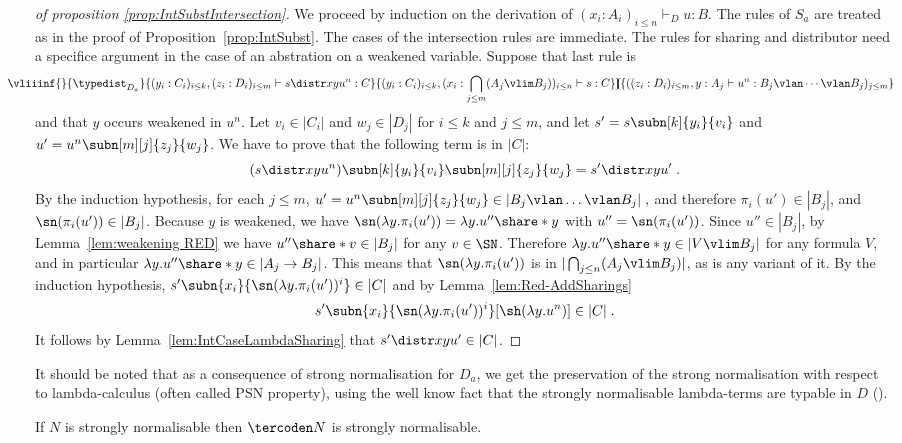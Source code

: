 \begin{proof}[of proposition \ref{prop:IntSubstIntersection}]
%
We proceed by induction on the derivation of $(x_i:A_i)_{i\leq n}\vdash_D u:B$. The rules of $S_a$ are treated as in the proof of Proposition~\ref{prop:IntSubst}. The cases of the 
intersection rules are immediate. The rules for sharing and distributor need a specifice argument in the case of an abstration on a weakened variable. Suppose that last rule is
\[
\hspace{-\leftmargin}
  \vliiinf{}{\typedist_{D_a}}
	{(y_i:C_i)_{i\leq k}, (z_i:D_i)_{i\leq m} \vdash s\distr xy{u^n} : C}
	{(y_i:C_i)_{i\leq k}, (x_i:\bigcap_{j\leq m}(A_j \vlim B_j))_{i\leq n} \vdash s : C}
	{\hspace{-6pt}}
	{((z_i:D_i)_{i\leq m}, y : A_j \vdash u^n : B_j\vlan\cdots\vlan B_j)_{j\leq m}}
\]
and that $y$ occurs weakened in $u^n$. Let $v_i\in|C_i|$ and $w_j\in|D_j|$ for $i\leq k$ and $j\leq m$, and let $s'=s\subn[k]{y_i}{v_i}$ and $u'=u^n\subn[m][j]{z_j}{w_j}$.
%
We have to prove that the following term is in $|C|$:
\[
	(s\distr xy{u^n})\subn[k]{y_i}{v_i}\subn[m][j]{z_j}{w_j}=s'\distr xy{u'}\;.
\]
%
By the induction hypothesis, for each $j\leq m$, $u'=u^n\subn[m][j]{z_j}{w_j}\in|B_j\vlan\dotso\vlan B_j|\;,$
and therefore $\pi_i(u')\in|B_j|$, and $\sn(\pi_i(u'))\in|B_j|$.
%
Because $y$ is weakened, we have $\sn(\lambda y.\pi_i(u'))=\lambda y.u''\share*{}y$ with $u''=\sn(\pi_i(u'))$.
%
Since $u''\in|B_j|$, by Lemma~\ref{lem:weakening RED} we have $u''\share*{}v\in|B_j|$ for any $v\in\SN$.
%
Therefore $\lambda y.u''\share*{}y\in|V\vlim B_j|$ for any formula $V$, and in particular $\lambda y.u''\share*{}y\in|A_j\to B_j|$.
%
This means that $\sn(\lambda y.\pi_i(u'))$ is in $|\bigcap_{j\leq n}(A_j\vlim B_j)|$, as is any variant of it.
%
By the induction hypothesis, $s'\subn{x_i}{\sn(\lambda y.\pi_i(u'))^i}\in|C|$ and by Lemma~\ref{lem:Red-AddSharings}
\[
	s'\subn{x_i}{\sn(\lambda y.\pi_i(u'))^i}[\sh(\lambda y.u^n)]\in|C|\;.
\]
It follows by Lemma~\ref{lem:IntCaseLambdaSharing} that $s'\distr xy{u'}\in|C|$.
%
\end{proof}

It should be noted that as a consequence of strong normalisation for $D_a$, we get the preservation of the strong normalisation with respect to lambda-calculus (often called PSN property), using the well know fact that the strongly normalisable lambda-terms are typable in $D$ (\cite{Coppo-DezaniCiancaglini-1980,Pottinger-1980,Krivine-1993}).


\begin{ALtheorem}[PSN]
If $N$ is strongly normalisable then $\tercoden N$ is strongly normalisable.
\end{ALtheorem}

